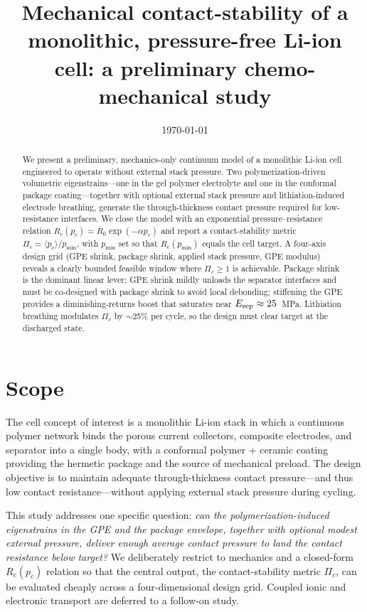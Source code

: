 \documentclass[11pt,letterpaper]{article}
\title{\textbf{Mechanical contact-stability of a monolithic, pressure-free
Li-ion cell: a preliminary chemo-mechanical study}}
\author{}
\date{\today}
\begin{document}
\maketitle

\begin{abstract}
We present a preliminary, mechanics-only continuum model of a monolithic
Li-ion cell engineered to operate without external stack pressure.  Two
polymerization-driven volumetric eigenstrains---one in the gel polymer
electrolyte and one in the conformal package coating---together with
optional external stack pressure and lithiation-induced electrode
breathing, generate the through-thickness contact pressure required for
low-resistance interfaces.  We close the model with an exponential
pressure--resistance relation $R_c(p_c) = R_0 \exp(-\alpha p_c)$ and
report a contact-stability metric $\Pi_c = \langle p_c \rangle /
p_{\min}$, with $p_{\min}$ set so that $R_c(p_{\min})$ equals the cell
target.  A four-axis design grid (GPE shrink, package shrink, applied
stack pressure, GPE modulus) reveals a clearly bounded feasible window
where $\Pi_c \ge 1$ is achievable.  Package shrink is the dominant
linear lever; GPE shrink mildly unloads the separator interfaces and
must be co-designed with package shrink to avoid local debonding;
stiffening the GPE provides a diminishing-returns boost that
saturates near $E_{\rm sep} \approx 25$~MPa.  Lithiation breathing
modulates $\Pi_c$ by $\sim$25\% per cycle, so the design must clear
target at the discharged state.
\end{abstract}

\section{Scope}

The cell concept of interest is a monolithic Li-ion stack in which a
continuous polymer network binds the porous current collectors,
composite electrodes, and separator into a single body, with a
conformal polymer + ceramic coating providing the hermetic package and
the source of mechanical preload.  The design objective is to maintain
adequate through-thickness contact pressure---and thus low contact
resistance---without applying external stack pressure during cycling.

This study addresses one specific question: \emph{can the
polymerization-induced eigenstrains in the GPE and the package
envelope, together with optional modest external pressure, deliver
enough average contact pressure to land the contact resistance below
target?}  We deliberately restrict to mechanics and a closed-form
$R_c(p_c)$ relation so that the central output, the contact-stability
metric $\Pi_c$, can be evaluated cheaply across a four-dimensional
design grid.  Coupled ionic and electronic transport are deferred to a
follow-on study.
\end{document}
